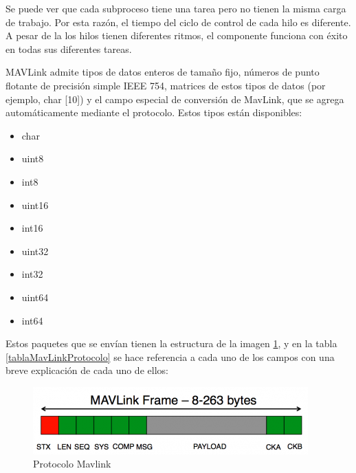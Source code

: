 Se puede ver que cada subproceso tiene una tarea pero no tienen la misma carga de trabajo.
Por esta razón, el tiempo del ciclo de control de cada hilo es diferente. A pesar de la los hilos tienen diferentes ritmos, el componente funciona con éxito en todas sus diferentes tareas.

MAVLink admite tipos de datos enteros de tamaño fijo, números de punto flotante de precisión simple IEEE 754, matrices de estos tipos de datos (por ejemplo, char [10]) y el campo especial de conversión de MavLink, que se agrega automáticamente mediante el protocolo. Estos tipos están disponibles:

\begin{multicols}{3}
\begin{itemize}
\item char
\item uint8
\item int8
\item uint16
\item int16
\item uint32
\item int32
\item uint64
\item int64
\end{itemize}
\end{multicols}

Estos paquetes que se envían tienen la estructura de la imagen \ref{fig:protocoloMavlink}, y en la tabla \ref{tablaMavLinkProtocolo} se hace referencia a cada uno de los campos con una breve explicación de cada uno de ellos:

\clearpage
\begin{figure}[H]
  \centering
  \includegraphics[scale=0.65]{imagenes/protocoloMavLink.png}
  \caption{Protocolo Mavlink}
  \label{fig:protocoloMavlink}
\end{figure}

